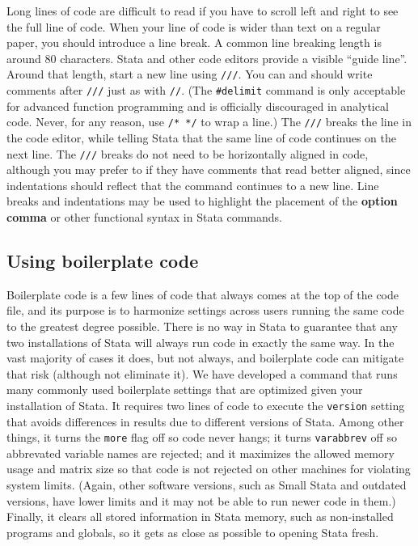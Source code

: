 Long lines of code are difficult to read if you have to scroll left and right to see the full line of code.
When your line of code is wider than text on a regular paper, you should introduce a line break.
A common line breaking length is around 80 characters.
Stata and other code editors provide a visible ``guide line''.
Around that length, start a new line using \texttt{///}.
You can and should write comments after \texttt{///} just as with \texttt{//}.
(The \texttt{\#delimit} command is only acceptable for advanced function programming
and is officially discouraged in analytical code.\cite{cox2005styleguide}
Never, for any reason, use \texttt{/* */} to wrap a line.)
The \texttt{///} breaks the line in the code editor,
while telling Stata that the same line of code continues on the next line.
The \texttt{///} breaks do not need to be horizontally aligned in code,
although you may prefer to if they have comments that read better aligned,
since indentations should reflect that the command continues to a new line.
Line breaks and indentations may be used to highlight the placement
of the \textbf{option comma} or other functional syntax in Stata commands.


\subsection{Using boilerplate code}

Boilerplate code is a few lines of code that always comes at the top of the code file,
and its purpose is to harmonize settings across users running the same code to the greatest degree possible. There is no way in Stata to guarantee that any two installations of Stata
will always run code in exactly the same way.
In the vast majority of cases it does, but not always,
and boilerplate code can mitigate that risk (although not eliminate it).
We have developed a command that runs many commonly used boilerplate settings
that are optimized given your installation of Stata.
It requires two lines of code to execute the \texttt{version}
setting that avoids differences in results due to different versions of Stata.
Among other things, it turns the \texttt{more} flag off so code never hangs;
it turns \texttt{varabbrev} off so abbrevated variable names are rejected;
and it maximizes the allowed memory usage and matrix size
so that code is not rejected on other machines for violating system limits.
(Again, other software versions, such as Small Stata and outdated versions,
have lower limits and it may not be able to run newer code in them.)
Finally, it clears all stored information in Stata memory,
such as non-installed programs and globals,
so it gets as close as possible to opening Stata fresh.

